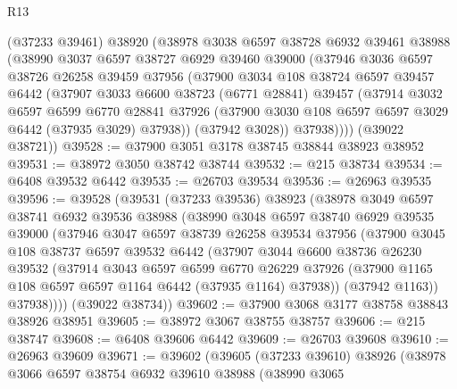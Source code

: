 \begin{lexlean}{R13}
\begin{coremodule}
      (@37233 @39461)
      @38920
      (@38978
        @3038
        @6597
        @38728
        @6932
        @39461
        @38988
        (@38990
          @3037
          @6597
          @38727
          @6929
          @39460
          @39000
          (@37946
            @3036
            @6597
            @38726
            @26258
            @39459
            @37956
            (@37900
              @3034
              @108
              @38724
              @6597
              @39457
              @6442
              (@37907
                @3033
                @6600
                @38723
                (@6771 @28841)
                @39457
                (@37914
                  @3032
                  @6597
                  @6599
                  @6770
                  @28841
                  @37926
                  (@37900 @3030 @108 @6597 @6597 @3029 @6442 (@37935 @3029) @37938))
                (@37942 @3028))
              @37938))))
      (@39022 @38721))
@39528 := @37900 @3051 @3178 @38745 @38844 @38923 @38952
@39531 := @38972 @3050 @38742 @38744
@39532 := @215 @38734
@39534 := @6408 @39532 @6442
@39535 := @26703 @39534
@39536 := @26963 @39535
@39596 := @39528
    (@39531
      (@37233 @39536)
      @38923
      (@38978
        @3049
        @6597
        @38741
        @6932
        @39536
        @38988
        (@38990
          @3048
          @6597
          @38740
          @6929
          @39535
          @39000
          (@37946
            @3047
            @6597
            @38739
            @26258
            @39534
            @37956
            (@37900
              @3045
              @108
              @38737
              @6597
              @39532
              @6442
              (@37907
                @3044
                @6600
                @38736
                @26230
                @39532
                (@37914
                  @3043
                  @6597
                  @6599
                  @6770
                  @26229
                  @37926
                  (@37900 @1165 @108 @6597 @6597 @1164 @6442 (@37935 @1164) @37938))
                (@37942 @1163))
              @37938))))
      (@39022 @38734))
@39602 := @37900 @3068 @3177 @38758 @38843 @38926 @38951
@39605 := @38972 @3067 @38755 @38757
@39606 := @215 @38747
@39608 := @6408 @39606 @6442
@39609 := @26703 @39608
@39610 := @26963 @39609
@39671 := @39602
    (@39605
      (@37233 @39610)
      @38926
      (@38978
        @3066
        @6597
        @38754
        @6932
        @39610
        @38988
        (@38990
          @3065

\end{coremodule}
\end{lexlean}
